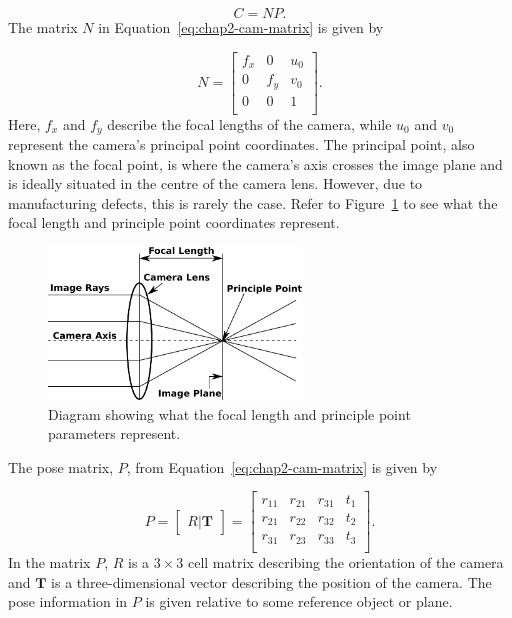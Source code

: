 \begin{equation}
  \label{eq:chap2-cam-matrix}
  C = 
  NP.
\end{equation}
The matrix $N$ in Equation~\ref{eq:chap2-cam-matrix} is given by

\begin{equation}
  \label{eq:chap2-cam-intrinsic}
  N = 
  \begin{bmatrix}
    f_x & 0   & u_0 \\
    0   & f_y & v_0 \\
    0   & 0   & 1   \\
  \end{bmatrix}.
\end{equation}
Here, $f_x$ and $f_y$ describe the focal lengths of the camera, while $u_0$ and $v_0$ represent the camera's principal point coordinates. The principal point, also known as the focal point, is where the camera's axis crosses the image plane and is ideally situated in the centre of the camera lens. However, due to manufacturing defects, this is rarely the case. Refer to Figure~\ref{fig:chap2-focal} to see what the focal length and principle point coordinates represent. 

\begin{figure}
  \centering
  \includegraphics[width=0.6\textwidth]{figures/chapter2/focal_details}
  \caption{Diagram showing what the focal length and principle point parameters represent. }
\label{fig:chap2-focal}
\end{figure}

The pose matrix, $P$, from Equation~\ref{eq:chap2-cam-matrix} is given by

\begin{equation}
  \label{eq:chap2-cam-extrinsic}
  P = 
  \begin{bmatrix}
    R | \bm{T}
  \end{bmatrix}
  =
  \begin{bmatrix}
    r_{11} & r_{21} & r_{31} & t_1 \\
    r_{21} & r_{22} & r_{32} & t_2 \\
    r_{31} & r_{23} & r_{33} & t_3 \\
  \end{bmatrix}.
\end{equation}
In the matrix $P$, $R$ is a $3\times3$ cell matrix describing the orientation of the camera and $\bm{T}$ is a three-dimensional vector describing the position of the camera. The pose information in $P$ is given relative to some reference object or plane. 

